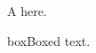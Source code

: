 \documentclass{article}
\begin{document}
A  here.

\begin{webstream}{box}Boxed text.\end{webstream}
\end{document}
